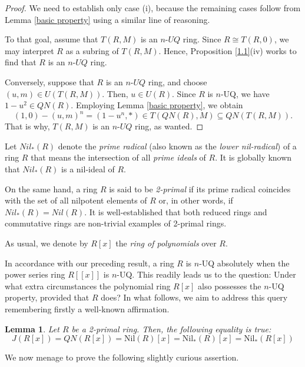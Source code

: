 \documentclass[10pt,a4paper]{amsart}
\newtheorem{lemma}[theorem]{Lemma}
\begin{document}
\begin{proof}
We need to establish only case (i), because the remaining cases follow from Lemma \ref{basic property} using a similar line of reasoning.

To that goal, assume that \( T(R, M) \) is an $n$-$UQ$ ring. Since \( R \cong T(R, 0) \), we may interpret \( R \) as a subring of \( T(R, M) \). Hence, Proposition \ref{1.1}(iv) works to find that \( R \) is an $n$-$UQ$ ring.

Conversely, suppose that \( R \) is an $n$-$UQ$ ring, and choose \( (u, m) \in U(T(R, M)) \). Then, \( u \in U(R) \). Since \( R \) is $n$-UQ, we have \( 1 - u^2 \in QN(R) \). Employing Lemma \ref{basic property}, we obtain
\[
(1, 0) - (u, m)^n = (1 - u^n, *) \in T(QN(R), M) \subseteq QN(T(R, M)).
\]
That is why, \( T(R, M) \) is an $n$-$UQ$ ring, as wanted.
\end{proof}

Let \( Nil_{*}(R) \) denote the {\it prime radical} (also known as the {\it lower nil-radical}) of a ring \( R \) that means the intersection of all {\it prime ideals} of \( R \). It is globally known that \( Nil_{*}(R) \) is a nil-ideal of \( R \).

On the same hand, a ring \( R \) is said to be {\it 2-primal} if its prime radical coincides with the set of all nilpotent elements of \( R \) or, in other words, if \( Nil_{*}(R) = Nil(R) \). It is well-established that both reduced rings and commutative rings are non-trivial examples of 2-primal rings.

As usual, we denote by \( R[x] \) the {\it ring of polynomials} over \( R \).

\medskip

In accordance with our preceding result, a ring $R$ is $n$-UQ absolutely when the power series ring $R[[x]]$ is $n$-UQ. This readily leads us to the question: Under what extra circumstances the polynomial ring $R[x]$ also possesses the $n$-UQ property, provided that $R$ does? In what follows, we aim to address this query remembering firstly a well-known affirmation.

\begin{lemma}\cite[Corollary 3.2.]{daoa}\label{cor 2 primal}
Let $R$ be a 2-primal ring. Then, the following equality is true:
\[ J(R[x]) = QN(R[x]) = \text{Nil}(R)[x] = \text{Nil}_*(R)[x] = \text{Nil}_*(R[x]) \]
\end{lemma}

We now menage to prove the following slightly curious assertion.
\end{document}
